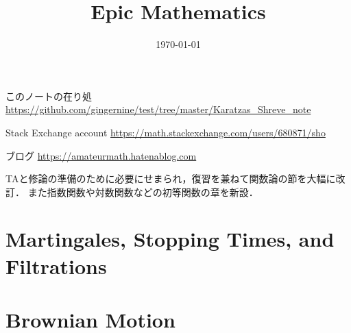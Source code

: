 \documentclass[a4j,10.5pt,oneside,openany]{jsbook}
\title{Epic Mathematics}
\date{\today}
\theoremstyle{mystyle}
\begin{document}
%
%
\maketitle
	このノートの在り処 \url{https://github.com/gingernine/test/tree/master/Karatzas_Shreve_note}

	Stack Exchange account \url{https://math.stackexchange.com/users/680871/sho}
	
	ブログ \url{https://amateurmath.hatenablog.com}
	
	TAと修論の準備のために必要にせまられ，復習を兼ねて関数論の節を大幅に改訂．
	また指数関数や対数関数などの初等関数の章を新設．
	\begin{comment}
	関数論(のまだ入り口)は積分論的に展開していますがそれ自体は売りではなく
	(そもそも連続関数や正則関数ばかり出てくる関数論をわざわざ積分論の上に展開するメリットがあるのかと
	突っ込まれるかもしれませんが，決してメリットが無いわけではなく，
	むしろ煩雑な議論が軽減されて見通しが良いでしょう．
	それに僕のノートの流れではそうせざるを得ません)，
	RudinのReal and Complex Analysisにおいて既に試みられています．
	売りは，積分路の微分可能性を外して，つまり連続性と有界変動性のみを仮定した下で，
	関数論の特に和書にはあまり見られない回転数と指数の繋がりを精密に分析し，
	AhlforsやRudinの流儀の``スマートな論理展開''を実現し(かけ)ているところです．
	意義も難易度も取るに足らないことかもしれませんが，
	多くの本は$C^1$級の積分路しか扱わないか，或いはゴツくて分かりづらい
	(論理式に書き起こしにくい)のが僕にとっては難点でしたので，
	ようやく自己流に関数論を展開する準備が出来て安心しています．
	\\
	\\
	\end{comment}
	
%
%
%
\tableofcontents
\frontmatter
%
\mainmatter
%
\chapter{Martingales, Stopping Times, and Filtrations}








\chapter{Brownian Motion}








\end{document}
